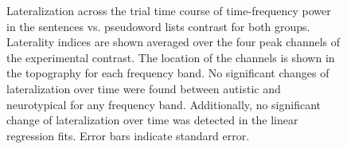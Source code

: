 \begin{figure}[!ht]
    \vspace{30pt}
	\centering
	\caption{Lateralization across the trial time course of time-frequency power in the sentences vs. pseudoword lists contrast for both groups. Laterality indices are shown averaged over the four peak channels of the experimental contrast. The location of the channels is shown in the topography for each frequency band. No significant changes of lateralization over time were found between autistic and neurotypical for any frequency band. Additionally, no significant change of lateralization over time was detected in the linear regression fits. Error bars indicate standard error. }
    \vspace*{-10pt}
	\label{fig:laterality-dynamics-peak}
\end{figure}